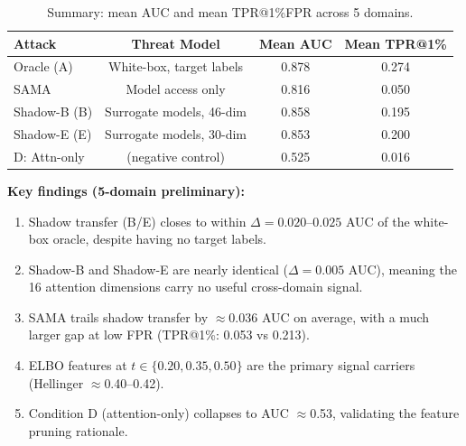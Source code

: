\documentclass[11pt,a4paper]{article}
\begin{document}
\begin{table}[ht]
\centering
\caption{Summary: mean AUC and mean TPR@1\%FPR across 5 domains.}
\label{tab:summary}
\begin{tabular}{lccc}
\toprule
\textbf{Attack} & \textbf{Threat Model} & \textbf{Mean AUC} & \textbf{Mean TPR@1\%} \\
\midrule
Oracle (A)     & White-box, target labels & 0.878 & 0.274 \\
SAMA           & Model access only         & 0.816 & 0.050 \\
Shadow-B (B)   & Surrogate models, 46-dim  & 0.858 & 0.195 \\
Shadow-E (E)   & Surrogate models, 30-dim  & 0.853 & 0.200 \\
\midrule
D: Attn-only   & (negative control)        & 0.525 & 0.016 \\
\bottomrule
\end{tabular}
\end{table}

\noindent\textbf{Key findings (5-domain preliminary):}
\begin{enumerate}
  \item Shadow transfer (B/E) closes to within $\Delta=0.020$--$0.025$ AUC of the white-box oracle, despite having no target labels.
  \item Shadow-B and Shadow-E are nearly identical ($\Delta=0.005$ AUC), meaning the 16 attention dimensions carry no useful cross-domain signal.
  \item SAMA trails shadow transfer by $\approx$0.036 AUC on average, with a much larger gap at low FPR (TPR@1\%: 0.053 vs 0.213).
  \item ELBO features at $t \in \{0.20, 0.35, 0.50\}$ are the primary signal carriers (Hellinger $\approx$0.40--0.42).
  \item Condition D (attention-only) collapses to AUC $\approx$0.53, validating the feature pruning rationale.
\end{enumerate}
\end{document}

